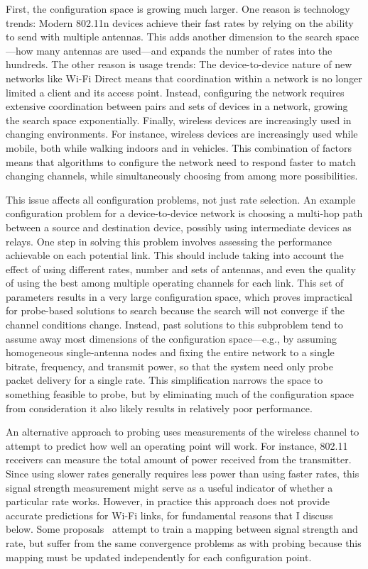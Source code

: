 First, the configuration space is growing much larger. One reason is technology trends: Modern 802.11n devices achieve their fast rates by relying on the ability to send with multiple antennas. This adds another dimension to the search space---how many antennas are used---and expands the number of rates into the hundreds. The other reason is usage trends: The device-to-device nature of new networks like Wi-Fi Direct means that coordination within a network is no longer limited a client and its access point. Instead, configuring the network requires extensive coordination between pairs and sets of devices in a network, growing the search space exponentially. Finally, wireless devices are increasingly used in changing environments. For instance, wireless devices are increasingly used while mobile, both while walking indoors and in vehicles. This combination of factors means that algorithms to configure the network need to respond faster to match changing channels, while simultaneously choosing from among more possibilities.

This issue affects all configuration problems, not just rate selection. An example configuration problem for a device-to-device network is choosing a multi-hop path between a source and destination device, possibly using intermediate devices as relays. One step in solving this problem involves assessing the performance achievable on each potential link. This should include taking into account the effect of using different rates, number and sets of antennas, and even the quality of using the best among multiple operating channels for each link. This set of parameters results in a very large configuration space, which proves impractical for probe-based solutions to search because the search will not converge if the channel conditions change. Instead, past solutions to this subproblem tend to assume away most dimensions of the configuration space---e.g., by assuming homogeneous single-antenna nodes and fixing the entire network to a single bitrate, frequency, and transmit power, so that the system need only probe packet delivery for a single rate. This simplification narrows the space to something feasible to probe, but by eliminating much of the configuration space from consideration it also likely results in relatively poor performance.

An alternative approach to probing uses measurements of the wireless channel to attempt to predict how well an operating point will work. For instance, 802.11 receivers can measure the total amount of power received from the transmitter. Since using slower rates generally requires less power than using faster rates, this signal strength measurement might serve as a useful indicator of whether a particular rate works. However, in practice this approach does not provide accurate predictions for Wi-Fi links, for fundamental reasons that I discuss below. Some proposals~\cite{Judd_CHARM} attempt to train a mapping between signal strength and rate, but suffer from the same convergence problems as with probing because this mapping must be updated independently for each configuration point.

